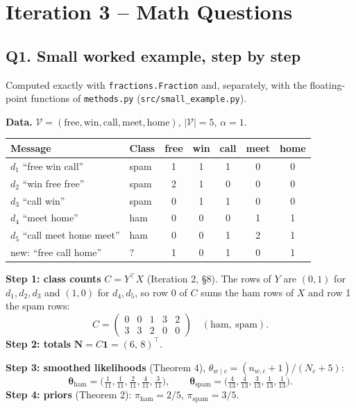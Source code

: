 \documentclass[11pt]{article}
\theoremstyle{plain}
\newcommand{\V}{\mathcal{V}}
\newcommand{\Vs}{|\mathcal{V}|}
\begin{document}
\section{Iteration 3 -- Math Questions}\label{sec:questions}

\subsection{Q1. Small worked example, step by step}\label{sec:q1}
Computed exactly with \texttt{fractions.Fraction} and, separately, with the floating-point
functions of \texttt{methods.py} (\texttt{src/small\_example.py}).

\textbf{Data.} $\V=(\text{free},\text{win},\text{call},\text{meet},\text{home})$, $\Vs=5$, $\alpha=1$.
\begin{center}
\begin{tabular}{@{}llccccc@{}}
\toprule
Message & Class & free & win & call & meet & home\\
\midrule
$d_1$ ``free win call'' & spam & 1 & 1 & 1 & 0 & 0\\
$d_2$ ``win free free'' & spam & 2 & 1 & 0 & 0 & 0\\
$d_3$ ``call win'' & spam & 0 & 1 & 1 & 0 & 0\\
$d_4$ ``meet home'' & ham & 0 & 0 & 0 & 1 & 1\\
$d_5$ ``call meet home meet'' & ham & 0 & 0 & 1 & 2 & 1\\
\midrule
new: ``free call home'' & ? & 1 & 0 & 1 & 0 & 1\\
\bottomrule
\end{tabular}
\end{center}

\textbf{Step 1: class counts} $C=Y^\top X$ (Iteration 2, \S8). The rows of $Y$ are
$(0,1)$ for $d_1,d_2,d_3$ and $(1,0)$ for $d_4,d_5$, so row 0 of $C$ sums the ham rows of $X$ and row 1 the spam rows:
\[
C=\begin{pmatrix}0&0&1&3&2\\3&3&2&0&0\end{pmatrix}\quad(\text{ham},\ \text{spam}).
\]
\textbf{Step 2: totals} $\mathbf N=C\mathbf 1=(6,\,8)^\top$.

\textbf{Step 3: smoothed likelihoods} (Theorem 4), $\theta_{w\mid c}=(n_{w,c}+1)/(N_c+5)$:
\[
\boldsymbol\theta_{\text{ham}}=\Big(\tfrac1{11},\tfrac1{11},\tfrac2{11},\tfrac4{11},\tfrac3{11}\Big),\qquad
\boldsymbol\theta_{\text{spam}}=\Big(\tfrac4{13},\tfrac4{13},\tfrac3{13},\tfrac1{13},\tfrac1{13}\Big).
\]
\textbf{Step 4: priors} (Theorem 2): $\pi_{\text{ham}}=2/5$, $\pi_{\text{spam}}=3/5$.
\end{document}
